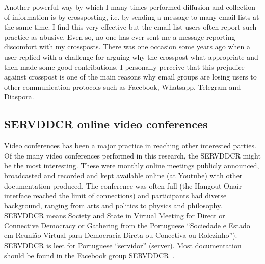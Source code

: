 \begin{apendicesenv}
Another powerful way by which I many times performed diffusion and collection
of information is by crossposting, i.e. by sending a message to many email lists
at the same time.
I find this very effective but the email list users often report such practice
as abusive.
Even so, no one has ever sent me a message reporting discomfort with my crossposts.
There was one occasion some years ago when a user replied with a challenge for
arguing why the crosspost what appropriate and then made some good contributions.
I personally perceive that this prejudice against crosspost is one of the main reasons
why email groups are losing users to other communication protocols such as Facebook, Whatsapp, Telegram and Diaspora.

\subsection{SERVDDCR online video conferences}\label{sec:serv}
Video conferences has been a major practice in reaching other interested parties.
Of the many video conferences performed in this research,
the SERVDDCR might be the most interesting.
These were monthly online meetings publicly announced, broadcasted and
recorded and kept available online (at Youtube) with other documentation produced.
The conference was often full (the Hangout Onair interface reached the limit of connections)
and participants had diverse background, ranging from arts and politics to physics and philosophy.
SERVDDCR means Society and State in Virtual Meeting for Direct or Connective Democracy or Gathering
from the Portuguese ``Sociedade e Estado em Reunião Virtual para Democracia Direta ou Conectiva ou Rolezinho'').
SERVDDCR is leet for Portuguese ``servidor'' (server).
Most documentation should be found in the Facebook group SERVDDCR~\cite{servidor}.


\end{apendicesenv}
